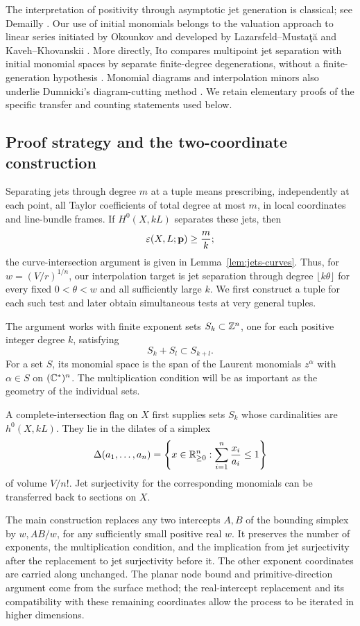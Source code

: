 The interpretation of positivity through asymptotic jet generation is
classical; see Demailly \cite[Section~6]{Demailly1992}.
Our use of initial monomials belongs to the valuation approach to linear
series initiated by Okounkov \cite{Okounkov1996} and developed by Lazarsfeld--Musta\c{t}\u{a}
\cite{LazarsfeldMustata2009} and Kaveh--Khovanskii
\cite{KavehKhovanskii2012}. More directly, Ito compares multipoint jet
separation with initial monomial spaces by separate finite-degree
degenerations, without a finite-generation hypothesis
\cite[Proposition~5.7 and Theorem~5.8]{Ito2013}.
Monomial diagrams and interpolation minors also underlie Dumnicki's
diagram-cutting method \cite[Proposition~13 and Theorem~14]{Dumnicki2007}.
We retain elementary proofs of the specific transfer and counting statements
used below.

\subsection{Proof strategy and the two-coordinate construction}

Separating jets through degree $m$ at a tuple means prescribing,
independently at each point, all Taylor coefficients of total degree at
most $m$, in local coordinates and line-bundle frames. If $H^0(X,kL)$
separates these jets, then
\[
 \varepsilon(X,L;\mathbf p)\ge \frac{m}{k};
\]
the curve-intersection argument is given in Lemma~\ref{lem:jets-curves}.
Thus, for $w=(V/r)^{1/n}$, our interpolation target is jet separation
through degree $\lfloor k\theta\rfloor$ for every fixed $0<\theta<w$
and all sufficiently large $k$. We first construct a tuple for each such
test and later obtain simultaneous tests at very general tuples.

The argument works with finite exponent sets
$S_k\subset\mathbb Z^n$, one for each positive integer degree $k$, satisfying
\[
 S_k+S_l\subset S_{k+l}.
\]
For a set $S$, its monomial space is the span of the Laurent monomials
$z^\alpha$ with $\alpha\in S$ on $(\mathbb C^*)^n$. The multiplication condition
will be as important as the geometry of the individual sets.

A complete-intersection flag on $X$ first supplies sets $S_k$ whose
cardinalities are $h^0(X,kL)$. They lie in the dilates of a simplex
\[
 \Delta(a_1,\ldots,a_n)
 =\left\{x\in\mathbb R_{\ge0}^n:\sum_{i=1}^n\frac{x_i}{a_i}\le1\right\}
\]
of volume $V/n!$. Jet surjectivity for the corresponding monomials can be
transferred back to sections on $X$.

The main construction replaces any two intercepts $A,B$ of the bounding
simplex by $w,AB/w$, for any sufficiently small positive real $w$.
It preserves the number of exponents, the multiplication condition, and
the implication from jet surjectivity after the replacement to jet
surjectivity before it. The other exponent coordinates are carried along
unchanged. The planar node bound and primitive-direction argument come
from the surface method; the real-intercept replacement and its compatibility
with these remaining coordinates allow the process to be iterated in
higher dimensions.

